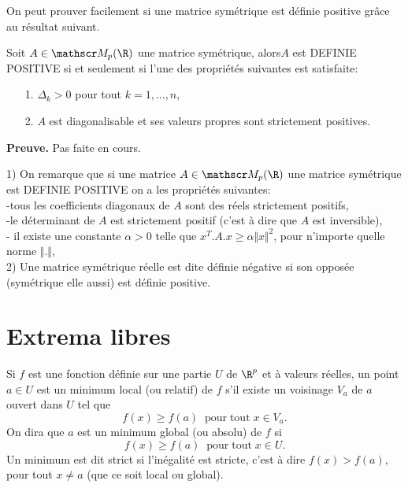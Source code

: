 \documentclass[class=report,crop=false]{standalone}
\begin{document}
\noindent On peut prouver facilement si une matrice symétrique est définie positive grâce au résultat suivant.

\begin{theoreme}
\textcolor[rgb]{0.44,0.00,0.87}{
   Soit
 $A \in \mat_p(\R)$ une matrice symétrique, alors$A$ est DEFINIE POSITIVE si et seulement si l'une des propriétés suivantes est satisfaite:
 \begin{itemize}
 \item[1.] $\Delta_k > 0$ pour tout $k=1,...,n$,
 \item[2.] $A$ est diagonalisable et ses valeurs propres sont strictement positives.
 \end{itemize}}
\end{theoreme}

{\textbf{Preuve.}} Pas faite en cours.

\begin{remarque*}
\textcolor[rgb]{0.00,0.00,1.00}{$ $\\
1) On remarque que si une matrice  $A \in \mat_p(\R)$ une matrice symétrique est DEFINIE POSITIVE on a les propriétés suivantes:\\
-tous les coefficients diagonaux de $A$ sont des réels strictement positifs,\\
-le déterminant de $A$ est strictement positif (c'est à dire que $A$ est inversible),\\
- il existe une constante $\alpha >0$ telle que $x^T.A.x \geq \alpha \Vert x \Vert^2$, pour n'importe quelle norme $\Vert. \Vert$,\\
2) Une matrice symétrique réelle est dite définie négative si son opposée (symétrique elle aussi) est définie positive.
 }
\end{remarque*}





\section{Extrema libres}


\begin{definition}
\textcolor[rgb]{0.98,0.00,0.00}{
  Si $f$ est une fonction d\'efinie sur une partie $U$ de $\R^p$ et \`a valeurs r\'eelles, un point $a \in U$
  est un minimum local (ou relatif) de $f$ s'il existe un voisinage $V_a$ de $a$ ouvert dans $U$ tel que
  \begin{equation*}
    f(x)\geq f(a) \;\mathrm{\;pour\;tout}\; x\in V_a.
  \end{equation*}
  On dira que $a$ est un minimum global (ou absolu) de $f$ si
  \begin{equation*}
    f(x) \geq f(a)\;\mathrm{\;pour\;tout}\; x\in U.
  \end{equation*}
  Un minimum est dit strict si l'in\'egalit\'e est stricte, c'est \`a dire $f(x)>f(a)$, pour tout $x\neq a$ (que ce soit local ou global).}
\end{definition}
\end{document}
